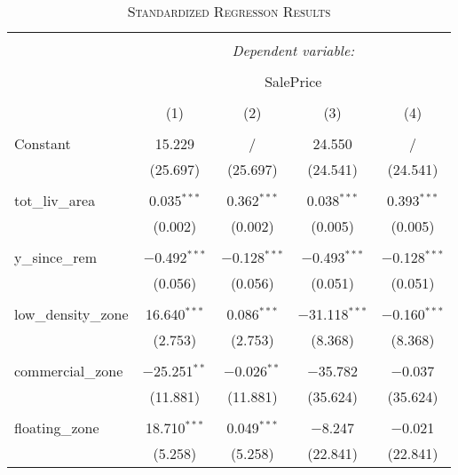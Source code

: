 \documentclass[a4paper]{article}
\begin{document}
\begin{table}[!htbp] \centering 
\begin{adjustwidth}{-0.0cm}{-0cm}
\begin{threeparttable}
\small
\captionsetup{font=small, justification=raggedright,singlelinecheck=false}
\caption{\textsc{Standardized Regresson Results}}
\centering 
  \label{}
\small 
\begin{tabular}{@{\extracolsep{1pt}}lcccc} 
\\[-5.8ex]\hline 
\hline \\[-1.8ex] 
 & \multicolumn{4}{c}{\textit{Dependent variable:}} \\ 
\cline{2-5} 
\\[-1.8ex] & \multicolumn{4}{c}{SalePrice} \\ 
\\[-1.8ex] & (1) & (2) & (3) & (4)\\ 
\hline \\[-1.8ex] 
 Constant & 15.229 & / & 24.550 & / \\ 
  & (25.697) & (25.697) & (24.541) & (24.541) \\ 
  & & & & \\ 
 tot\_liv\_area & 0.035$^{***}$ & 0.362$^{***}$ & 0.038$^{***}$ & 0.393$^{***}$ \\ 
  & (0.002) & (0.002) & (0.005) & (0.005) \\ 
  & & & & \\ 
 y\_since\_rem & $-$0.492$^{***}$ & $-$0.128$^{***}$ & $-$0.493$^{***}$ & $-$0.128$^{***}$ \\ 
  & (0.056) & (0.056) & (0.051) & (0.051) \\ 
  & & & & \\ 
 low\_density\_zone & 16.640$^{***}$ & 0.086$^{***}$ & $-$31.118$^{***}$ & $-$0.160$^{***}$ \\ 
  & (2.753) & (2.753) & (8.368) & (8.368) \\ 
  & & & & \\ 
 commercial\_zone & $-$25.251$^{**}$ & $-$0.026$^{**}$ & $-$35.782 & $-$0.037 \\ 
  & (11.881) & (11.881) & (35.624) & (35.624) \\ 
  & & & & \\ 
 floating\_zone & 18.710$^{***}$ & 0.049$^{***}$ & $-$8.247 & $-$0.021 \\ 
  & (5.258) & (5.258) & (22.841) & (22.841) \\ 

\end{tabular}
\end{threeparttable}
\end{adjustwidth}
\end{table}
\end{document}
